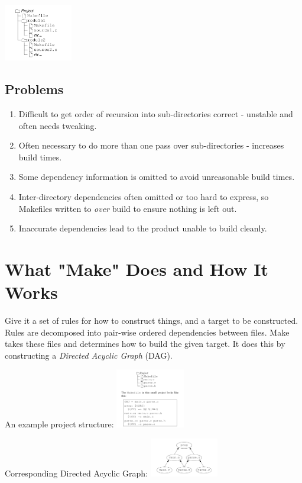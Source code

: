\includegraphics[width=3cm]{structure}
\subsection{Problems}
\begin{enumerate}
\item Difficult to get order of recursion into sub-directories correct - unstable and 
often needs tweaking.
\item Often necessary to do more than one pass over sub-directories - increases build times.
\item Some dependency information is omitted to avoid unreasonable build times.
\item Inter-directory dependencies often omitted or too hard to express, so Makefiles written to 
\textit{over} build to ensure nothing is left out.
\item Inaccurate dependencies lead to the product unable to build cleanly.
\end{enumerate}

\section{What "Make" Does and How It Works}

Give it a set of rules for how to construct things, and a target to be constructed. Rules 
are decomposed into pair-wise ordered dependencies between files. Make takes these files 
and determines how to build the given target. It does this by constructing a
\textit{Directed Acyclic Graph} (DAG).

An example project structure:
\includegraphics[width=3cm]{simpleproject}

Corresponding Directed Acyclic Graph:
\includegraphics[width=3cm]{dag}

